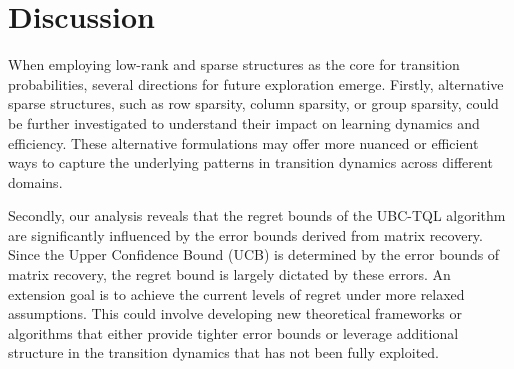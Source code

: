 \section{Discussion}

When employing low-rank and sparse structures as the core for transition probabilities, several directions for future exploration emerge. Firstly, alternative sparse structures, such as row sparsity, column sparsity, or group sparsity, could be further investigated to understand their impact on learning dynamics and efficiency. These alternative formulations may offer more nuanced or efficient ways to capture the underlying patterns in transition dynamics across different domains.

Secondly, our analysis reveals that the regret bounds of the UBC-TQL algorithm are significantly influenced by the error bounds derived from matrix recovery. Since the Upper Confidence Bound (UCB) is determined by the error bounds of matrix recovery, the regret bound is largely dictated by these errors. An extension goal is to achieve the current levels of regret under more relaxed assumptions. This could involve developing new theoretical frameworks or algorithms that either provide tighter error bounds or leverage additional structure in the transition dynamics that has not been fully exploited.